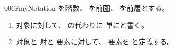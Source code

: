 \documentclass[index]{subfiles}
\begin{document}
\begin{myBlock}{006F}{myNotation}
  を階数、
  を前圏、
  を前層とする。
  \begin{enumerate}
  \item 対象に対して、
    の代わりに
    単にと書く。
  \item 対象と
    射と
    要素に対して、
    要素を
    と定義する。
  \end{enumerate}
\end{myBlock}
\end{document}
